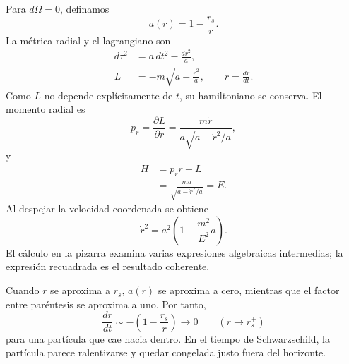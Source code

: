Para \(d\Omega=0\), definamos
\begin{equation}
a(r)=1-\frac{r_s}{r}.
\label{eq:l5-a-def}
\end{equation}
La métrica radial y el lagrangiano son
\begin{align}
d\tau^2&=a\,dt^2-\frac{dr^2}{a},\\
L&=-m\sqrt{a-\frac{\dot r^2}{a}},
\qquad
\dot r=\frac{dr}{dt}.
\label{eq:l5-radial-lagrangian}
\end{align}
Como \(L\) no depende explícitamente de \(t\), su hamiltoniano se conserva. El momento radial es
\begin{equation}
p_r=\frac{\partial L}{\partial\dot r}
=\frac{m\dot r}{a\sqrt{a-\dot r^2/a}},
\label{eq:l5-radial-momentum}
\end{equation}
y
\begin{align}
H
&=p_r\dot r-L\\
&=\frac{ma}{\sqrt{a-\dot r^2/a}}
=E.
\label{eq:l5-radial-energy}
\end{align}
Al despejar la velocidad coordenada se obtiene
\begin{equation}
\boxed{
\dot r^2
=a^2\left(1-\frac{m^2}{E^2}a\right).
}
\label{eq:l5-radial-velocity}
\end{equation}
El cálculo en la pizarra examina varias expresiones algebraicas intermedias; la expresión recuadrada es el resultado coherente.

Cuando \(r\) se aproxima a \(r_s\), \(a(r)\) se aproxima a cero, mientras que el factor entre paréntesis se aproxima a uno. Por tanto,
\begin{equation}
\frac{dr}{dt}
\sim -\left(1-\frac{r_s}{r}\right)
\longrightarrow 0
\qquad(r\longrightarrow r_s^+)
\label{eq:l5-infall-freeze}
\end{equation}
para una partícula que cae hacia dentro. En el tiempo de Schwarzschild, la partícula parece ralentizarse y quedar congelada justo fuera del horizonte.

\begin{classroomqa}
\end{classroomqa}

